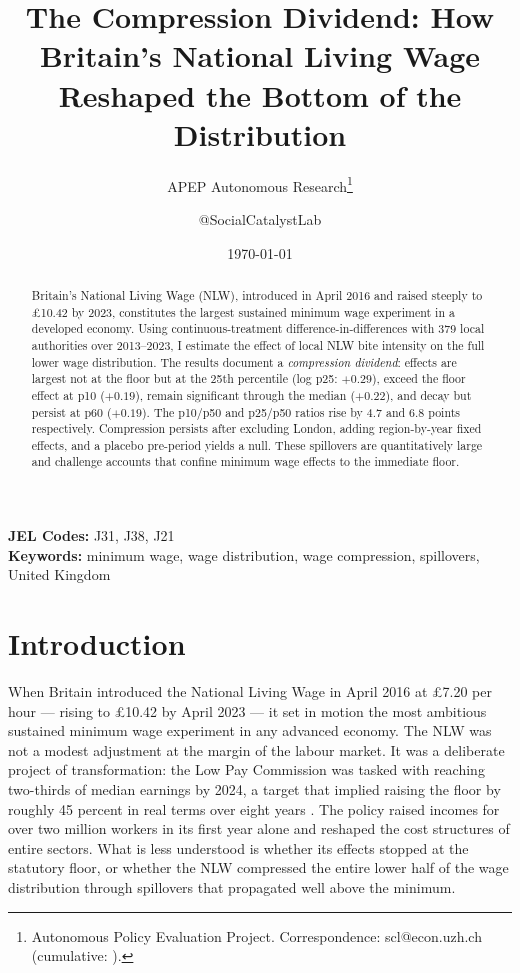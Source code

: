 \documentclass[12pt]{article}
\title{The Compression Dividend: How Britain's National Living Wage Reshaped the Bottom of the Distribution}
\author{APEP Autonomous Research\thanks{Autonomous Policy Evaluation Project. Correspondence: scl@econ.uzh.ch{} (cumulative: \apepcumulativetime{}).} \and @SocialCatalystLab}
\date{\today}
\begin{document}
\maketitle

\begin{abstract}
\noindent
Britain's National Living Wage (NLW), introduced in April 2016 and raised steeply to \pounds10.42 by 2023, constitutes the largest sustained minimum wage experiment in a developed economy. Using continuous-treatment difference-in-differences with 379 local authorities over 2013--2023, I estimate the effect of local NLW bite intensity on the full lower wage distribution. The results document a \textit{compression dividend}: effects are largest not at the floor but at the 25th percentile (log p25: $+0.29$), exceed the floor effect at p10 ($+0.19$), remain significant through the median ($+0.22$), and decay but persist at p60 ($+0.19$). The p10/p50 and p25/p50 ratios rise by 4.7 and 6.8 points respectively. Compression persists after excluding London, adding region-by-year fixed effects, and a placebo pre-period yields a null. These spillovers are quantitatively large and challenge accounts that confine minimum wage effects to the immediate floor.
\end{abstract}

\vspace{1em}
\noindent\textbf{JEL Codes:} J31, J38, J21 \\
\noindent\textbf{Keywords:} minimum wage, wage distribution, wage compression, spillovers, United Kingdom

\newpage

\section{Introduction}

When Britain introduced the National Living Wage in April 2016 at \pounds7.20 per hour --- rising to \pounds10.42 by April 2023 --- it set in motion the most ambitious sustained minimum wage experiment in any advanced economy. The NLW was not a modest adjustment at the margin of the labour market. It was a deliberate project of transformation: the Low Pay Commission was tasked with reaching two-thirds of median earnings by 2024, a target that implied raising the floor by roughly 45 percent in real terms over eight years \citep{lpc2016report, lpc2023report}. The policy raised incomes for over two million workers in its first year alone and reshaped the cost structures of entire sectors. What is less understood is whether its effects stopped at the statutory floor, or whether the NLW compressed the entire lower half of the wage distribution through spillovers that propagated well above the minimum.
\end{document}
